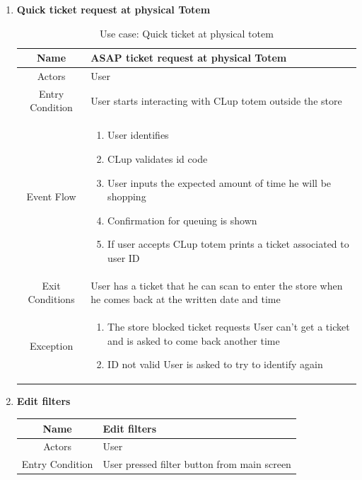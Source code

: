 \begin{enumerate}
\item \textbf{Quick ticket request at physical Totem}

\begin{table}[H]
{
	\begin{tabular}{|c|p{14cm}|}
		\hline
		Name & ASAP ticket request at physical Totem\\
		\hline
		Actors & User\\
		\hline
		Entry Condition & User starts interacting with CLup totem outside the store\\
		\hline
		
		Event Flow & \begin{enumerate}
			\item User identifies
			\item CLup validates id code
			\item User inputs the expected amount of time he will be shopping
			\item Confirmation for queuing is shown
			\item If user accepts CLup totem prints a ticket associated to user ID
			
			
		\end{enumerate}\\
		
		\hline
		Exit Conditions & User has a ticket that he can scan to enter the store when he comes back at the written date and time\\
		\hline
		
		Exception & \begin{enumerate}
			\item The store blocked ticket requests\newline
			User can’t get a ticket and is asked to come back another time
			\item ID not valid\newline
			User is asked to try to identify again
			
		\end{enumerate}\\
		
		\hline
	\end{tabular}
}
	\label{tab:UCTotem}
	\caption{Use case: Quick ticket at physical totem}
\end{table}

\item \textbf{Edit filters}

\begin{table}[H]
{
	\begin{tabular}{|c|p{14cm}|}
		\hline
		Name & Edit filters\\
		\hline
		Actors & User\\
		\hline
		Entry Condition & User pressed filter button from main screen\\
		\hline
		

\end{tabular}}
\end{table}
\end{enumerate}
